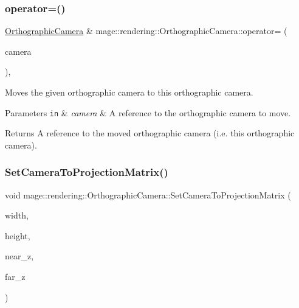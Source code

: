 \subsubsection{\texorpdfstring{operator=()}{operator=()}\hspace{0.1cm}{\footnotesize\ttfamily [2/2]}}
{\footnotesize\ttfamily \hyperlink{classmage_1_1rendering_1_1_orthographic_camera}{Orthographic\+Camera} \& mage\+::rendering\+::\+Orthographic\+Camera\+::operator= (\begin{DoxyParamCaption}\item[{\hyperlink{classmage_1_1rendering_1_1_orthographic_camera}{Orthographic\+Camera} \&\&}]{camera }\end{DoxyParamCaption})\hspace{0.3cm}{\ttfamily [default]}, {\ttfamily [noexcept]}}

Moves the given orthographic camera to this orthographic camera.


\begin{DoxyParams}[1]{Parameters}
\mbox{\tt in}  & {\em camera} & A reference to the orthographic camera to move. \\
\hline
\end{DoxyParams}
\begin{DoxyReturn}{Returns}
A reference to the moved orthographic camera (i.\+e. this orthographic camera). 
\end{DoxyReturn}
\hypertarget{classmage_1_1rendering_1_1_orthographic_camera_ac6bbf8ceb2c7c02703f0b753b6475ad0}{}\label{classmage_1_1rendering_1_1_orthographic_camera_ac6bbf8ceb2c7c02703f0b753b6475ad0} 
\subsubsection{\texorpdfstring{Set\+Camera\+To\+Projection\+Matrix()}{SetCameraToProjectionMatrix()}}
{\footnotesize\ttfamily void mage\+::rendering\+::\+Orthographic\+Camera\+::\+Set\+Camera\+To\+Projection\+Matrix (\begin{DoxyParamCaption}\item[{\hyperlink{namespacemage_aa97e833b45f06d60a0a9c4fc22ae02c0}{F32}}]{width,  }\item[{\hyperlink{namespacemage_aa97e833b45f06d60a0a9c4fc22ae02c0}{F32}}]{height,  }\item[{\hyperlink{namespacemage_aa97e833b45f06d60a0a9c4fc22ae02c0}{F32}}]{near\+\_\+z,  }\item[{\hyperlink{namespacemage_aa97e833b45f06d60a0a9c4fc22ae02c0}{F32}}]{far\+\_\+z }\end{DoxyParamCaption})\hspace{0.3cm}{\ttfamily [noexcept]}}

